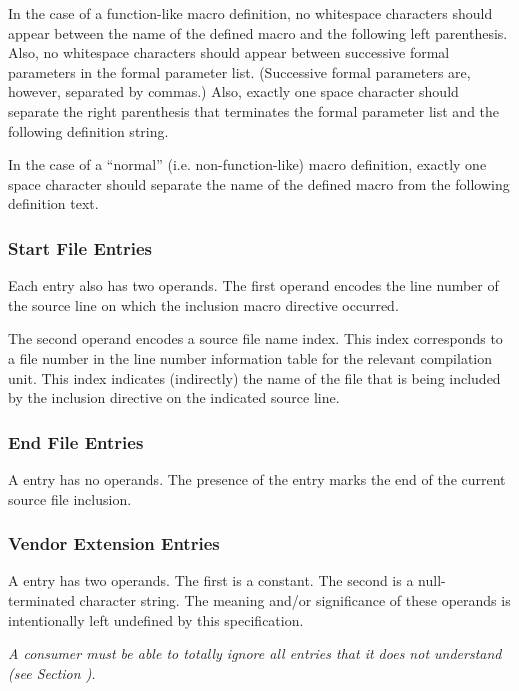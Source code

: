 In the case of a function-like macro definition, no whitespace
characters should appear between the name of the defined
macro and the following left parenthesis. Also, no whitespace
characters should appear between successive formal parameters
in the formal parameter list. (Successive formal parameters
are, however, separated by commas.) Also, exactly one space
character should separate the right parenthesis that terminates
the formal parameter list and the following definition string.

In the case of a ``normal'' (i.e. non-function-like) macro
definition, exactly one space character should separate the
name of the defined macro from the following definition text.



\subsubsection{Start File Entries}
\label{chap:startfileentries}
Each  entry also has two operands. The
first operand encodes the line number of the source line on
which the inclusion macro directive occurred.

The second operand encodes a source file name index. This index
corresponds to a file number in the line number information
table for the relevant compilation unit. This index indicates
(indirectly) the name of the file that is being included by
the inclusion directive on the indicated source line.

\subsubsection{End File Entries}
\label{chap:endfileentries}
A  entry has no operands. The presence of
the entry marks the end of the current source file inclusion.

\subsubsection{Vendor Extension Entries}
\label{chap:vendorextensionentries}
A  entry has two operands. The first
is a constant. The second is a null-terminated character
string. The meaning and/or significance of these operands is
intentionally left undefined by this specification.

\textit{A consumer must be able to totally ignore all
 entries that it does not understand
(see Section ).}


